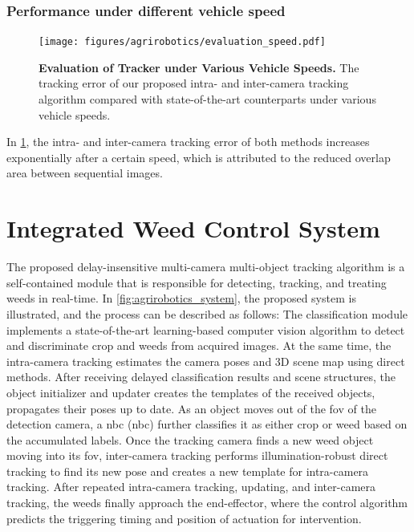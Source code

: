 \subsubsection{Performance under different vehicle speed}

\begin{figure}[t] 
	\centering
	\texttt{[image: figures/agrirobotics/evaluation\_speed.pdf]}
	\caption[Evaluation of Tracker under Various Vehicle Speeds] { \textbf{Evaluation of Tracker under Various Vehicle Speeds.} The tracking error of our proposed intra- and inter-camera tracking algorithm compared with state-of-the-art counterparts under various vehicle speeds. 
	\label{fig:agrirobotics_speed}}
\end{figure}

In \ref{fig:agrirobotics_speed}, the intra- and inter-camera tracking error of both methods increases exponentially after a certain speed, which is attributed to the reduced overlap area between sequential images.

\section{Integrated Weed Control System}

The proposed delay-insensitive multi-camera multi-object tracking algorithm is a self-contained module that is responsible for detecting, tracking, and treating weeds in real-time. 
In \ref{fig:agrirobotics_system}, the proposed system is illustrated, and the process can be described as follows: The classification module implements a state-of-the-art learning-based computer vision algorithm to detect and discriminate crop and weeds from acquired images. 
At the same time, the intra-camera tracking estimates the camera poses and 3D scene map using direct methods. 
After receiving delayed classification results and scene structures, the object initializer and updater creates the templates of the received objects, propagates their poses up to date. 
As an object moves out of the \acrshort{fov} of the detection camera, a \acrlong{nbc} (\acrshort{nbc}) further classifies it as either crop or weed based on the accumulated labels. 
Once the tracking camera finds a new weed object moving into its \acrshort{fov}, inter-camera tracking performs illumination-robust direct tracking to find its new pose and creates a new template for intra-camera tracking. 
After repeated intra-camera tracking, updating, and inter-camera tracking, the weeds finally approach the end-effector, where the control algorithm predicts the triggering timing and position of actuation for intervention.

